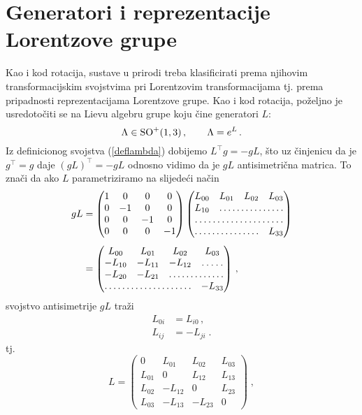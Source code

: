 \section{Generatori i reprezentacije Lorentzove grupe}

\label{id:5}
Kao i kod rotacija, sustave u prirodi treba klasificirati prema
njihovim transformacijskim svojstvima pri Lorentzovim transformacijama
tj. prema pripadnosti reprezentacijama Lorentzove
grupe. Kao i kod rotacija, poželjno je usredotočiti se na Lievu algebru
grupe koju čine generatori $L$:
\begin{equation}
    \Lambda \in \mathrm{SO}^{+}(1,3) \,, \qquad \Lambda = e^L \,.
\end{equation}
Iz definicionog svojstva (\ref{deflambda}) dobijemo $L^\top g = -g L$,
što uz činjenicu da je $g^\top = g$ daje $(gL)^\top = -gL$ odnosno
vidimo da je $gL$ antisimetrična matrica. To znači da ako $L$
parametriziramo na slijedeći način
\begin{align}
 gL &= 
\begin{pmatrix}
1 & 0 & 0 & 0 \\
0 &-1 & 0 & 0 \\
0 & 0 &-1 & 0 \\
0 & 0 & 0 &-1
\end{pmatrix}
\begin{pmatrix}
L_{00} & L_{01} & L_{02} & L_{03}\\
L_{10} &\hdotsfor{3} \\
\hdotsfor{4} \\
\hdotsfor{3} & L_{33}
\end{pmatrix} \\[1ex]
&= 
\begin{pmatrix}
L_{00} & L_{01} & L_{02} & L_{03}\\
-L_{10} & -L_{11} & -L_{12} &\hdotsfor{1} \\
-L_{20} & -L_{21} & \hdotsfor{2} \\
\hdotsfor{3} & -L_{33}
\end{pmatrix} \,,
\end{align}
svojstvo antisimetrije $gL$ traži
\begin{align}
L_{0i} &= L_{i0} \,, \\
L_{ij} &= - L_{ji} \;.
\end{align}
tj.
\begin{equation}
 L = \begin{pmatrix}
0 & L_{01} & L_{02} & L_{03}\\
L_{01} & 0 & L_{12} & L_{13}\\
L_{02} & -L_{12} & 0& L_{23} \\
L_{03} & -L_{13} &-L_{23} & 0
\end{pmatrix} \;,
\end{equation}
